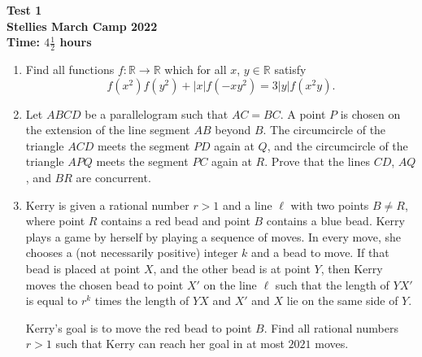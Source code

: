 \documentclass{article}
\begin{document}
\thispagestyle{empty}

\begin{center}
  \textbf{\Large Test 1}
  \\ \vspace{1em}
  \textbf{\large Stellies March Camp 2022}
  \\ \vspace{1em}
  \textbf{\large Time: $4\frac{1}{2}$ hours}
\end{center}

\bigskip

\begin{enumerate}[itemsep=12pt]

\item %
Find all functions $f : \mathbb{R} \to \mathbb{R}$ which for all $x$, $y \in \mathbb{R}$ satisfy
\[ f(x^{2})f(y^{2}) + |x|f(-xy^{2}) = 3|y|f(x^{2}y). \]

\item %
Let $ABCD$ be a parallelogram such that $AC = BC$.
A point $P$ is chosen on the extension of the line segment $AB$ beyond $B$.
The circumcircle of the triangle $ACD$ meets the segment $PD$ again at $Q$, and the circumcircle of the triangle $APQ$ meets the segment $PC$ again at $R$.
Prove that the lines $CD$, $AQ$, and $BR$ are concurrent.

\item %
Kerry is given a rational number $r > 1$ and a line $\ell$ with two points $B \neq R$, where point $R$ contains a red bead and point $B$ contains a blue bead.
Kerry plays a game by herself by playing a sequence of moves.
In every move, she chooses a (not necessarily positive) integer $k$ and a bead to move.
If that bead is placed at point $X$, and the other bead is at point $Y$, then Kerry moves the chosen bead to point $X'$ on the line $\ell$ such that the length of $YX'$ is equal to $r^k$ times the length of $YX$ and $X'$ and $X$ lie on the same side of $Y$.

Kerry's goal is to move the red bead to point $B$.
Find all rational numbers $r > 1$ such that Kerry can reach her goal in at most $2021$ moves.

\end{enumerate}
\end{document}
